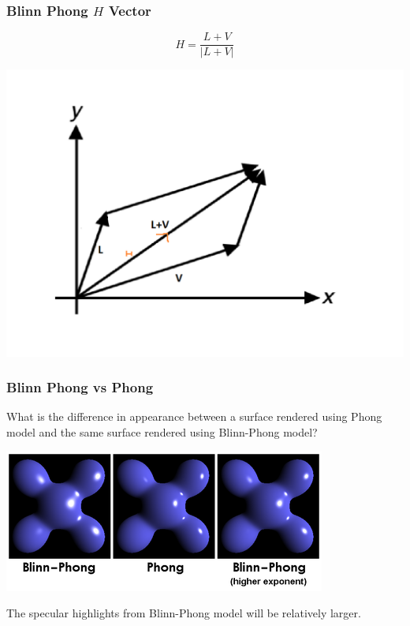 \documentclass{beamer}
\begin{document}
\begin{frame}
    \frametitle{Blinn Phong $H$ Vector}

    \begin{equation*}
        H = \frac{L + V}{|L + V|}
    \end{equation*}

    \begin{center}
        \includegraphics[scale=0.4]{h-vector.png}
    \end{center}

\end{frame}

\begin{frame}
    \frametitle{Blinn Phong vs Phong}

    What is the difference in appearance between a surface rendered using
    Phong model and the same surface rendered using Blinn-Phong model?

    \begin{center}
        \includegraphics[scale=0.4]{blinnvsphong.png}
    \end{center}

    \begin{tcolorbox}
        The specular highlights from Blinn-Phong model will be relatively larger.
    \end{tcolorbox}

\end{frame}
\end{document}
